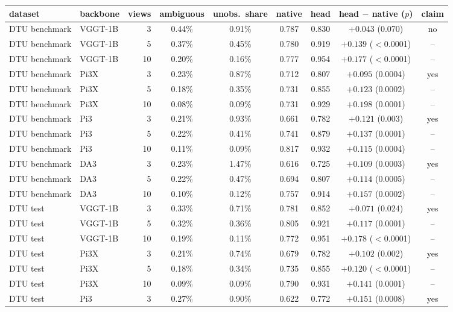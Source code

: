 \begin{tabular}{llrcccccc}
\toprule
dataset & backbone & views & ambiguous & unobs.\ share & native & head & head $-$ native ($p$) & claim \\
\midrule
DTU benchmark & VGGT-1B & 3 & 0.44\% & 0.91\% & 0.787 & 0.830 & $+0.043$ (0.070) & no \\
DTU benchmark & VGGT-1B & 5 & 0.37\% & 0.45\% & 0.780 & 0.919 & $+0.139$ ($<$0.0001) & -- \\
DTU benchmark & VGGT-1B & 10 & 0.20\% & 0.16\% & 0.777 & 0.954 & $+0.177$ ($<$0.0001) & -- \\
DTU benchmark & Pi3X & 3 & 0.23\% & 0.87\% & 0.712 & 0.807 & $+0.095$ (0.0004) & yes \\
DTU benchmark & Pi3X & 5 & 0.18\% & 0.35\% & 0.731 & 0.855 & $+0.123$ (0.0002) & -- \\
DTU benchmark & Pi3X & 10 & 0.08\% & 0.09\% & 0.731 & 0.929 & $+0.198$ (0.0001) & -- \\
DTU benchmark & Pi3 & 3 & 0.21\% & 0.93\% & 0.661 & 0.782 & $+0.121$ (0.003) & yes \\
DTU benchmark & Pi3 & 5 & 0.22\% & 0.41\% & 0.741 & 0.879 & $+0.137$ (0.0001) & -- \\
DTU benchmark & Pi3 & 10 & 0.11\% & 0.09\% & 0.817 & 0.932 & $+0.115$ (0.0004) & -- \\
DTU benchmark & DA3 & 3 & 0.23\% & 1.47\% & 0.616 & 0.725 & $+0.109$ (0.0003) & yes \\
DTU benchmark & DA3 & 5 & 0.22\% & 0.47\% & 0.694 & 0.807 & $+0.114$ (0.0005) & -- \\
DTU benchmark & DA3 & 10 & 0.10\% & 0.12\% & 0.757 & 0.914 & $+0.157$ (0.0002) & -- \\
\midrule
DTU test & VGGT-1B & 3 & 0.33\% & 0.71\% & 0.781 & 0.852 & $+0.071$ (0.024) & yes \\
DTU test & VGGT-1B & 5 & 0.32\% & 0.36\% & 0.805 & 0.921 & $+0.117$ (0.0001) & -- \\
DTU test & VGGT-1B & 10 & 0.19\% & 0.11\% & 0.772 & 0.951 & $+0.178$ ($<$0.0001) & -- \\
DTU test & Pi3X & 3 & 0.21\% & 0.74\% & 0.679 & 0.782 & $+0.102$ (0.002) & yes \\
DTU test & Pi3X & 5 & 0.18\% & 0.34\% & 0.735 & 0.855 & $+0.120$ ($<$0.0001) & -- \\
DTU test & Pi3X & 10 & 0.09\% & 0.09\% & 0.790 & 0.931 & $+0.141$ (0.0001) & -- \\
DTU test & Pi3 & 3 & 0.27\% & 0.90\% & 0.622 & 0.772 & $+0.151$ (0.0008) & yes \\

\end{tabular}
